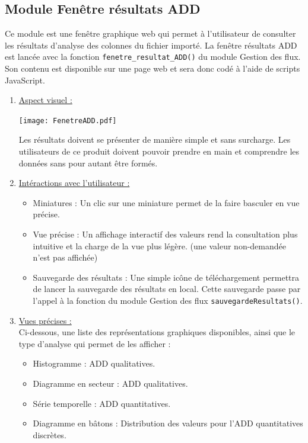			
		\subsection{Module Fenêtre résultats ADD}
			Ce module est une fenêtre graphique web qui permet à l'utilisateur de consulter les résultats d'analyse des colonnes du fichier importé. La fenêtre résultats ADD est lancée avec la fonction \lstinline!fenetre_resultat_ADD()! du module Gestion des flux. Son contenu est disponible sur une page web et sera donc codé à l'aide de scripts JavaScript.
			\begin{enumerate}
				\item \underline{Aspect visuel :}\\
					\begin{center}\texttt{[image: FenetreADD.pdf]}\end{center}
					Les résultats doivent se présenter de manière simple et sans surcharge. Les utilisateurs de ce produit doivent pouvoir prendre en main et comprendre les données sans pour autant être formés.
				\item \underline{Intéractions avec l'utilisateur :}\\
					\begin{itemize}
						\item Miniatures : Un clic sur une miniature permet de la faire basculer en vue précise.
						\item Vue précise : Un affichage interactif des valeurs rend la consultation plus intuitive et la charge de la vue plus légère. (une valeur non-demandée n'est pas affichée)
						\item Sauvegarde des résultats : Une simple icône de téléchargement permettra de lancer la sauvegarde des résultats en local. Cette sauvegarde passe par l'appel à la fonction du module Gestion des flux \lstinline!sauvegardeResultats()!.
					\end{itemize}
				\item \underline{Vues précises :}\\
					Ci-dessous, une liste des représentations graphiques disponibles, ainsi que le type d'analyse qui permet de les afficher :
					\begin{itemize}
						\item Histogramme : ADD qualitatives.
						\item Diagramme en secteur : ADD qualitatives.
						\item Série temporelle : ADD quantitatives.
						\item Diagramme en bâtons : Distribution des valeurs pour l'ADD quantitatives discrètes.

\end{itemize}
\end{enumerate}
